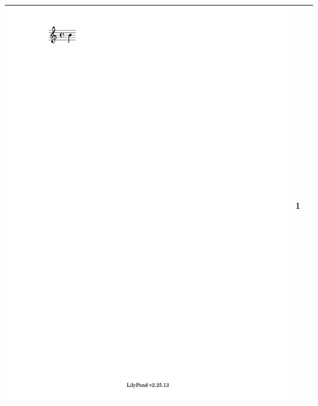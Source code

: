 \documentclass[11pt]{article}
\theoremstyle{definition}
\begin{document}
\begin{table}
\begin{tabular}{|c|c|c|}
\includegraphics[trim=4.29cm 27cm 16cm 1.5cm, clip, scale=1]{quarter_note.pdf} & 1 \\
\hline

\end{tabular}
\end{table}
\end{document}
